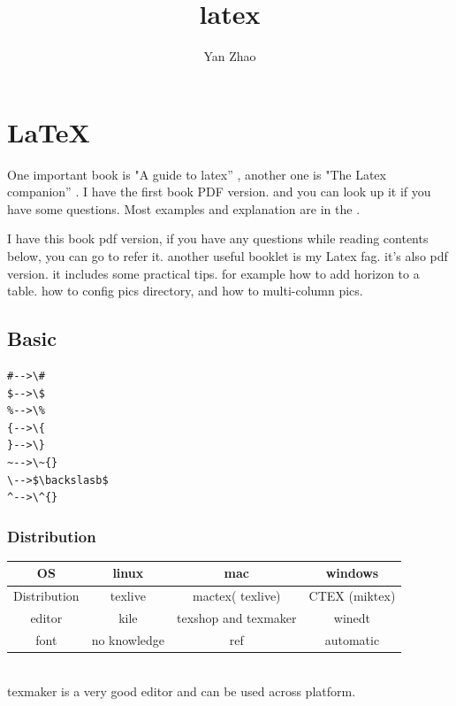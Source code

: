 \documentclass[a4paper,12pt,twoside]{book}
\begin{document}

\title{latex}
\author{Yan Zhao}
\date{}\maketitle

\else
\chapter{\LaTeX}
\fi


	One important book is "A guide to latex'' \cite{Guide}, another one is "The Latex companion'' \cite{Companion}. I have the first book PDF version. and you can look up it if you have some questions. Most examples and explanation are in the \cite{Guide}.

	I have this book pdf version, if you have any questions while reading contents below, you can go to refer it. another useful booklet is my Latex fag. it's also pdf version. it includes some practical tips. for example how to add horizon to a table. how to config pics directory, and how to multi-column pics.

	
\section{Basic}

\begin{verbatim}
#-->\#
$-->\$
%-->\%
{-->\{
}-->\}
~-->\~{}
\-->$\backslasb$
^-->\^{}
\end{verbatim}

	\subsection{Distribution}
		\begin{tabular}{|c|c|c|c|}
		\hline OS & linux & mac & windows \\
		\hline Distribution & texlive & mactex( texlive) & CTEX (miktex) \\
		\hline editor & kile & texshop and texmaker & winedt \\
		\hline font & no knowledge & ref\cite{MacFont} & automatic \\
		\hline
		\end{tabular} \\
		texmaker is a very good editor and can be used across platform. \\
		
\end{document}
